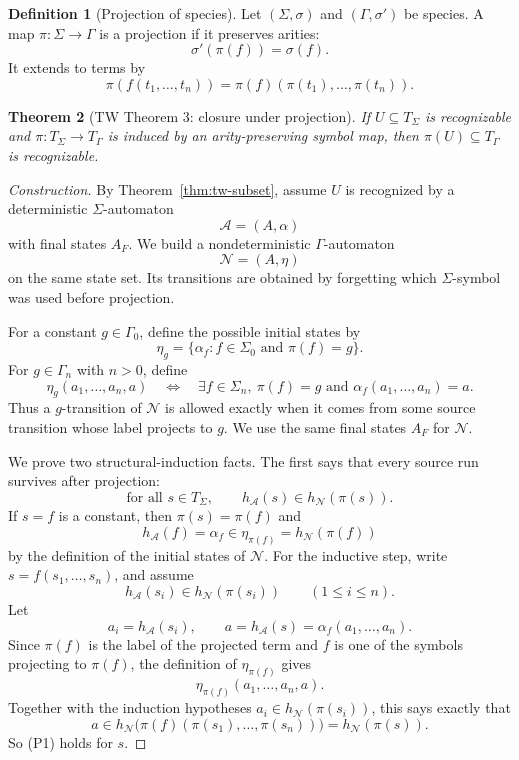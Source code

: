 \documentclass[11pt]{article}
\newtheorem{theorem}{Theorem}
\theoremstyle{definition}
\newtheorem{definition}[theorem]{Definition}
\newcommand{\SigmaSym}{\Sigma}
\newcommand{\rank}{\sigma}
\newcommand{\Term}[1]{T_{#1}}
\newcommand{\Aut}{\mathcal A}
\begin{document}
\begin{definition}[Projection of species]
Let \((\SigmaSym,\rank)\) and \((\Gamma,\rank')\) be species.  A map
\(\pi:\SigmaSym\to\Gamma\) is a projection if it preserves arities:
\[
  \rank'(\pi(f))=\rank(f).
\]
It extends to terms by
\[
  \pi(f(t_1,\ldots,t_n))
  =
  \pi(f)(\pi(t_1),\ldots,\pi(t_n)).
\]
\end{definition}

\begin{theorem}[TW Theorem 3: closure under projection]\label{thm:tw-projection}
If \(U\subseteq\Term{\SigmaSym}\) is recognizable and
\(\pi:\Term{\SigmaSym}\to\Term{\Gamma}\) is induced by an arity-preserving symbol
map, then \(\pi(U)\subseteq\Term{\Gamma}\) is recognizable.
\end{theorem}

\begin{proof}[Construction]
By Theorem~\ref{thm:tw-subset}, assume \(U\) is recognized by a deterministic
\(\SigmaSym\)-automaton
\[
  \Aut=(A,\alpha)
\]
with final states \(A_F\).  We build a nondeterministic \(\Gamma\)-automaton
\[
  \mathcal N=(A,\eta)
\]
on the same state set.  Its transitions are obtained by forgetting which
\(\SigmaSym\)-symbol was used before projection.

For a constant \(g\in\Gamma_0\), define the possible initial states by
\[
  \eta_g
  =
  \{\alpha_f:f\in\SigmaSym_0\text{ and }\pi(f)=g\}.
\]
For \(g\in\Gamma_n\) with \(n>0\), define
\[
  \eta_g(a_1,\ldots,a_n,a)
  \quad\Longleftrightarrow\quad
  \exists f\in\SigmaSym_n,\ \pi(f)=g
  \text{ and }
  \alpha_f(a_1,\ldots,a_n)=a.
\]
Thus a \(g\)-transition of \(\mathcal N\) is allowed exactly when it comes from
some source transition whose label projects to \(g\).  We use the same final
states \(A_F\) for \(\mathcal N\).

We prove two structural-induction facts.  The first says that every source run
survives after projection:
\[
  \text{for all }s\in\Term{\SigmaSym},\qquad
  h_\Aut(s)\in h_{\mathcal N}(\pi(s)).            \tag{P1}
\]
If \(s=f\) is a constant, then \(\pi(s)=\pi(f)\) and
\[
  h_\Aut(f)=\alpha_f\in\eta_{\pi(f)}=h_{\mathcal N}(\pi(f))
\]
by the definition of the initial states of \(\mathcal N\).  For the inductive
step, write \(s=f(s_1,\ldots,s_n)\), and assume
\[
  h_\Aut(s_i)\in h_{\mathcal N}(\pi(s_i))
  \qquad (1\le i\le n).
\]
Let
\[
  a_i=h_\Aut(s_i),\qquad
  a=h_\Aut(s)=\alpha_f(a_1,\ldots,a_n).
\]
Since \(\pi(f)\) is the label of the projected term and \(f\) is one of the
symbols projecting to \(\pi(f)\), the definition of \(\eta_{\pi(f)}\) gives
\[
  \eta_{\pi(f)}(a_1,\ldots,a_n,a).
\]
Together with the induction hypotheses \(a_i\in h_{\mathcal N}(\pi(s_i))\),
this says exactly that
\[
  a\in h_{\mathcal N}\bigl(\pi(f)(\pi(s_1),\ldots,\pi(s_n))\bigr)
  =
  h_{\mathcal N}(\pi(s)).
\]
So (P1) holds for \(s\).


\end{proof}
\end{document}
